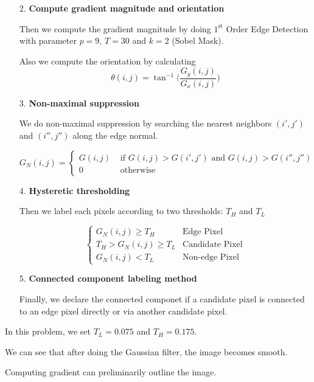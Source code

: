 \documentclass{article}
\newcommand{\tb}{\textbf}
\begin{document}
\begin{enumerate}[label=(\alph*)]
\begin{enumerate}
        \item [2.] \tb{Compute gradient magnitude and orientation}

        Then we compute the gradient magnitude by doing $1^\text{st}$ Order Edge Detection with parameter $p = 9$, $T = 30$ and $k = 2$ (Sobel Mask). 
        
        Also we compute the orientation by calculating $$\theta(i, j) = \tan^{-1} \Bigg(\frac{G_y(i, j)}{G_x(i, j)}\Bigg)$$

        \item [3.] \tb{Non-maximal suppression}

        We do non-maximal suppression by searching the nearest neighbors $(i', j')$ and $(i'', j'')$ along the edge normal.

        $$
        G_N(i, j) =
        \begin{cases}
            G(i, j) & \text{ if } G(i, j) > G(i', j') \text{ and } G(i, j) > G(i'', j'') \\
            0       & \text{ otherwise }
        \end{cases}
        $$

        \item [4.] \tb{Hysteretic thresholding}

        Then we label each pixels according to two thresholds: $T_H$ and $T_L$

        $$
        \begin{cases}
            G_N(i, j) \ge T_H & \text{Edge Pixel} \\
            T_H > G_N(i, j) \ge T_L & \text{Candidate Pixel} \\
            G_N(i, j) < T_L & \text{Non-edge Pixel}
        \end{cases}
        $$

        \item [5.] \tb{Connected component labeling method}

        Finally, we declare the connected componet if a candidate pixel is connected to an edge pixel directly or via another candidate pixel.
    \end{enumerate}

    \newpage

    In this problem, we set $T_L = 0.075$ and $T_H = 0.175$.

    We can see that after doing the Gaussian filter, the image becomes smooth.
    
    Computing gradient can preliminarily outline the image.
    

\end{enumerate}
\end{document}
